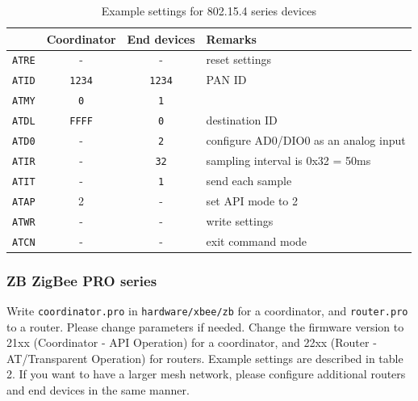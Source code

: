\documentclass[9pt]{jsarticle}
\begin{document}
\begin{table}[htdp]
\begin{center}
\small
\begin{tabular}{|r|c|c|l|}
\hline   & Coordinator & End devices & Remarks \\\hline
\hline \texttt{ATRE} & - & - & reset settings \\
\hline \texttt{ATID} & \texttt{1234} & \texttt{1234} & PAN ID \\
\hline \texttt{ATMY} & \texttt{0} & \texttt{1} &  \\
\hline \texttt{ATDL} & \texttt{FFFF} & \texttt{0} & destination ID \\
\hline \texttt{ATD0} & - & \texttt{2} & configure AD0/DIO0 as an analog input \\
\hline \texttt{ATIR} & - & \texttt{32} & sampling interval is 0x32 = 50ms \\
\hline \texttt{ATIT} & - & \texttt{1} & send each sample \\
\hline \texttt{ATAP} & 2 & - & set API mode to 2 \\
\hline \texttt{ATWR} & - & - & write settings \\
\hline \texttt{ATCN} & - & - & exit command mode \\
\hline 
\end{tabular} 
\caption{Example settings for 802.15.4 series devices}
\end{center}
\label{xbee}
\end{table}

\newpage
\subsubsection{ZB ZigBee PRO series}
Write \texttt{coordinator.pro} in \texttt{hardware/xbee/zb} for a coordinator, and \texttt{router.pro} to a router. Please change parameters if needed. Change the firmware version to 21xx (Coordinator - API Operation) for a coordinator, and 22xx (Router - AT/Transparent Operation) for routers. Example settings are described in table 2. If you want to have a larger mesh network, please configure additional routers and end devices in the same manner.
\end{document}
